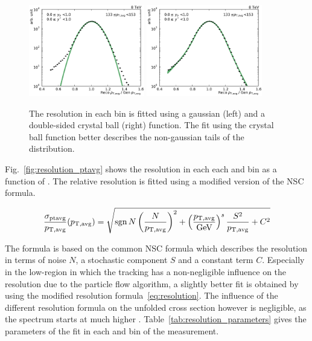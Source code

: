 \begin{figure}[htbp]
    \centering
    \includegraphics[width=0.45\textwidth]{figures/measurement/resolution_yb0ys0_bin10.pdf}\hfill
    \includegraphics[width=0.45\textwidth]{figures/measurement/resolution_yb0ys0_bin10_cb.pdf}
    \caption[Gaussian and crystal ball fit of resolution.]{The resolution in
        each bin is fitted using a gaussian (left) and a double-sided crystal ball
        (right) function. The fit using the crystal ball function better describes the
        non-gaussian tails of the distribution.}
    \label{fig:resolution_bin}
\end{figure}

Fig.~\ref{fig:resolution_ptavg} shows the resolution in each each \ystar and
\yboost bin as a function of \ptavg. The relative resolution is fitted using a
modified version of the NSC formula.


\begin{equation}
    \frac{\sigma_{\text{ptavg}}}{p_{\mathrm{T,avg}}} (p_{\mathrm{T,avg}}) = \sqrt{\operatorname{sgn}{N} \left(\frac{N}{p_{\mathrm{T,avg}}}\right)^2 + \left(\frac{p_{\mathrm{T,avg}}}{\text{GeV}}\right)^s \frac{S^2}{p_{\mathrm{T,avg}}} + C^2 }
    \label{eq:resolution}
\end{equation}

The formula is based on the common NSC formula which describes the resolution in
terms of noise $N$, a stochastic component $S$ and a constant term $C$.
Especially in the low-\pt region in which the tracking has a non-negligible
influence on the resolution due to the particle flow algorithm, a slightly
better fit is obtained by using the modified resolution
formula~\ref{eq:resolution}. The influence of the different resolution formula
on the unfolded cross section however is negligible, as the spectrum starts at
much higher \pt. Table~\ref{tab:resolution_parameters} gives the parameters of
the fit in each \ystar and \yboost bin of the measurement.


